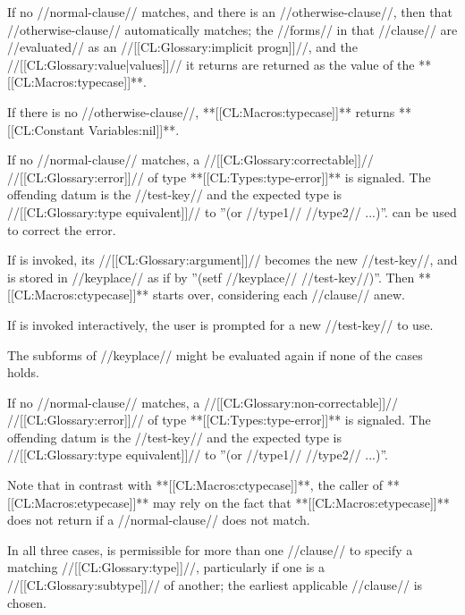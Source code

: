 \beginlist


If no //normal-clause// matches, and there is an //otherwise-clause//, then that //otherwise-clause// automatically matches; the //forms// in that //clause// are //evaluated// as an //[[CL:Glossary:implicit progn]]//, and the //[[CL:Glossary:value|values]]// it returns are returned as the value of the **[[CL:Macros:typecase]]**.

If there is no //otherwise-clause//, **[[CL:Macros:typecase]]** returns **[[CL:Constant Variables:nil]]**.


If no //normal-clause// matches, a //[[CL:Glossary:correctable]]// //[[CL:Glossary:error]]// of type **[[CL:Types:type-error]]** is signaled. The offending datum is the //test-key// and the expected type is //[[CL:Glossary:type equivalent]]// to ''(or //type1// //type2// ...)''.  can be used to correct the error.

If  is invoked, its //[[CL:Glossary:argument]]// becomes the new //test-key//, and is stored in //keyplace// as if by ''(setf //keyplace// //test-key//)''. Then **[[CL:Macros:ctypecase]]** starts over, considering each //clause// anew.

If  is invoked interactively, the user is prompted for a new //test-key// to use.

The subforms of //keyplace// might be evaluated again if none of the cases holds.


If no //normal-clause// matches, a //[[CL:Glossary:non-correctable]]// //[[CL:Glossary:error]]// of type **[[CL:Types:type-error]]** is signaled. The offending datum is the //test-key// and the expected type is //[[CL:Glossary:type equivalent]]// to ''(or //type1// //type2// ...)''.

Note that in contrast with **[[CL:Macros:ctypecase]]**, the caller of **[[CL:Macros:etypecase]]** may rely on the fact that **[[CL:Macros:etypecase]]** does not return if a //normal-clause// does not match.

\endlist

In all three cases, is permissible for more than one //clause// to specify a matching //[[CL:Glossary:type]]//, particularly if one is a //[[CL:Glossary:subtype]]// of another; the earliest applicable //clause// is chosen.

